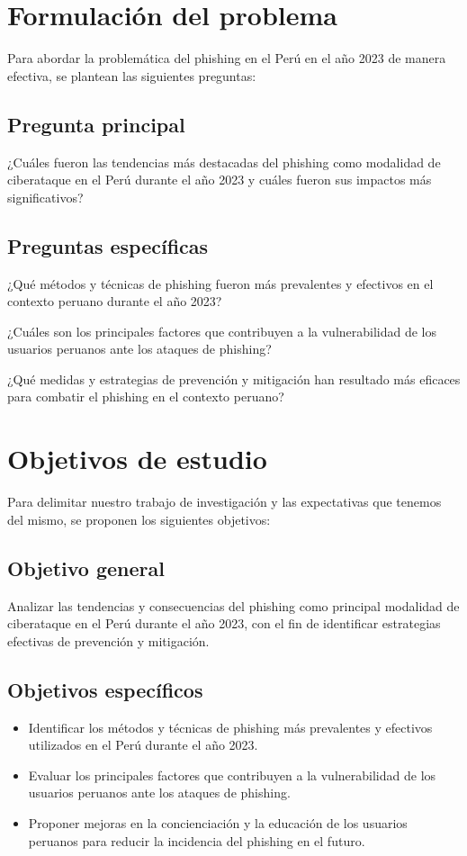 \newpage
\section{Formulación del problema}

\noindent Para abordar la problemática del phishing en el Perú en el año 2023 de manera efectiva, se plantean las siguientes preguntas:\par
\subsection{Pregunta principal}
\noindent ¿Cuáles fueron las tendencias más destacadas del phishing como modalidad de ciberataque en el Perú durante el año 2023 y cuáles fueron sus impactos más significativos? \par
\subsection{Preguntas específicas}
\noindent ¿Qué métodos y técnicas de phishing fueron más prevalentes y efectivos en el contexto peruano durante el año 2023? \par
\noindent ¿Cuáles son los principales factores que contribuyen a la vulnerabilidad de los usuarios peruanos ante los ataques de phishing? \par
\noindent ¿Qué medidas y estrategias de prevención y mitigación han resultado más eficaces para combatir el phishing en el contexto peruano? \par

\section{Objetivos de estudio}

\noindent Para delimitar nuestro trabajo de investigación y las expectativas que tenemos del mismo, se proponen los siguientes objetivos: \par
\subsection{Objetivo general}
\noindent Analizar las tendencias y consecuencias del phishing como principal modalidad de ciberataque en el Perú durante el año 2023, con el fin de identificar estrategias efectivas de prevención y mitigación. \par
\subsection{Objetivos específicos}
\begin{itemize}
    \item Identificar los métodos y técnicas de phishing más prevalentes y efectivos utilizados en el Perú durante el año 2023.
    \item Evaluar los principales factores que contribuyen a la vulnerabilidad de los usuarios peruanos ante los ataques de phishing.
    \item Proponer mejoras en la concienciación y la educación de los usuarios peruanos para reducir la incidencia del phishing en el futuro.
\end{itemize}
